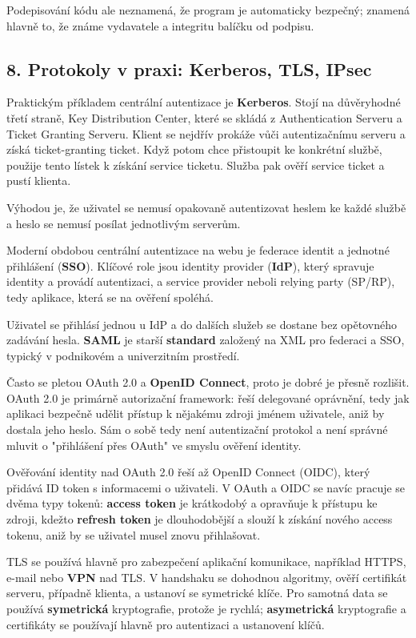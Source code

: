Podepisování kódu ale neznamená, že program je automaticky bezpečný; znamená hlavně to, že známe vydavatele a integritu balíčku od podpisu.

\subsection*{8. Protokoly v praxi: Kerberos, TLS, IPsec}

Praktickým příkladem centrální autentizace je \textbf{Kerberos}. Stojí na důvěryhodné třetí straně, Key Distribution Center, které se skládá z Authentication Serveru a Ticket Granting Serveru. Klient se nejdřív prokáže vůči autentizačnímu serveru a získá ticket-granting ticket. Když potom chce přistoupit ke konkrétní službě, použije tento lístek k získání service ticketu. Služba pak ověří service ticket a pustí klienta.

Výhodou je, že uživatel se nemusí opakovaně autentizovat heslem ke každé službě a heslo se nemusí posílat jednotlivým serverům.

Moderní obdobou centrální autentizace na webu je federace identit a jednotné přihlášení (\textbf{SSO}). Klíčové role jsou identity provider (\textbf{IdP}), který spravuje identity a provádí autentizaci, a service provider neboli relying party (SP/RP), tedy aplikace, která se na ověření spoléhá.

Uživatel se přihlásí jednou u IdP a do dalších služeb se dostane bez opětovného zadávání hesla. \textbf{SAML} je starší \textbf{standard} založený na XML pro federaci a SSO, typický v podnikovém a univerzitním prostředí.

Často se pletou OAuth 2.0 a \textbf{OpenID Connect}, proto je dobré je přesně rozlišit. OAuth 2.0 je primárně autorizační framework: řeší delegované oprávnění, tedy jak aplikaci bezpečně udělit přístup k nějakému zdroji jménem uživatele, aniž by dostala jeho heslo. Sám o sobě tedy není autentizační protokol a není správné mluvit o "přihlášení přes OAuth" ve smyslu ověření identity.

Ověřování identity nad OAuth 2.0 řeší až OpenID Connect (OIDC), který přidává ID token s informacemi o uživateli. V OAuth a OIDC se navíc pracuje se dvěma typy tokenů: \textbf{access token} je krátkodobý a opravňuje k přístupu ke zdroji, kdežto \textbf{refresh token} je dlouhodobější a slouží k získání nového access tokenu, aniž by se uživatel musel znovu přihlašovat.

TLS se používá hlavně pro zabezpečení aplikační komunikace, například HTTPS, e-mail nebo \textbf{VPN} nad TLS. V handshaku se dohodnou algoritmy, ověří certifikát serveru, případně klienta, a ustanoví se symetrické klíče. Pro samotná data se používá \textbf{symetrická} kryptografie, protože je rychlá; \textbf{asymetrická} kryptografie a certifikáty se používají hlavně pro autentizaci a ustanovení klíčů.

